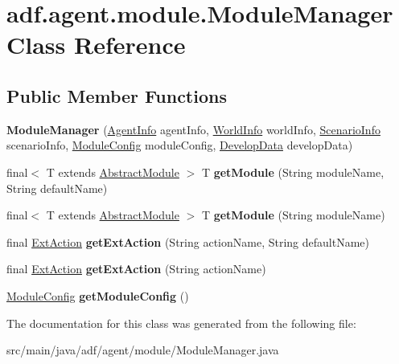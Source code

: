 \hypertarget{classadf_1_1agent_1_1module_1_1ModuleManager}{}\section{adf.\+agent.\+module.\+Module\+Manager Class Reference}
\label{classadf_1_1agent_1_1module_1_1ModuleManager}
\subsection*{Public Member Functions}
\begin{DoxyCompactItemize}
\item 
\hypertarget{classadf_1_1agent_1_1module_1_1ModuleManager_ac16f2c9e14069d9b77054a12e5b58b15}{}\label{classadf_1_1agent_1_1module_1_1ModuleManager_ac16f2c9e14069d9b77054a12e5b58b15} 
{\bfseries Module\+Manager} (\hyperlink{classadf_1_1agent_1_1info_1_1AgentInfo}{Agent\+Info} agent\+Info, \hyperlink{classadf_1_1agent_1_1info_1_1WorldInfo}{World\+Info} world\+Info, \hyperlink{classadf_1_1agent_1_1info_1_1ScenarioInfo}{Scenario\+Info} scenario\+Info, \hyperlink{classadf_1_1agent_1_1config_1_1ModuleConfig}{Module\+Config} module\+Config, \hyperlink{classadf_1_1agent_1_1develop_1_1DevelopData}{Develop\+Data} develop\+Data)
\item 
\hypertarget{classadf_1_1agent_1_1module_1_1ModuleManager_ae5bfff73dd4e1a9a70add9a92df5135b}{}\label{classadf_1_1agent_1_1module_1_1ModuleManager_ae5bfff73dd4e1a9a70add9a92df5135b} 
final$<$ T extends \hyperlink{classadf_1_1component_1_1module_1_1AbstractModule}{Abstract\+Module} $>$ T {\bfseries get\+Module} (String module\+Name, String default\+Name)
\item 
\hypertarget{classadf_1_1agent_1_1module_1_1ModuleManager_a97f961775277112b300c281b55b2571f}{}\label{classadf_1_1agent_1_1module_1_1ModuleManager_a97f961775277112b300c281b55b2571f} 
final$<$ T extends \hyperlink{classadf_1_1component_1_1module_1_1AbstractModule}{Abstract\+Module} $>$ T {\bfseries get\+Module} (String module\+Name)
\item 
\hypertarget{classadf_1_1agent_1_1module_1_1ModuleManager_a3f0a47b5d48381227842734b20fc2aee}{}\label{classadf_1_1agent_1_1module_1_1ModuleManager_a3f0a47b5d48381227842734b20fc2aee} 
final \hyperlink{classadf_1_1component_1_1extaction_1_1ExtAction}{Ext\+Action} {\bfseries get\+Ext\+Action} (String action\+Name, String default\+Name)
\item 
\hypertarget{classadf_1_1agent_1_1module_1_1ModuleManager_a6c4b4d88631190f3d7f2254918d934fa}{}\label{classadf_1_1agent_1_1module_1_1ModuleManager_a6c4b4d88631190f3d7f2254918d934fa} 
final \hyperlink{classadf_1_1component_1_1extaction_1_1ExtAction}{Ext\+Action} {\bfseries get\+Ext\+Action} (String action\+Name)
\item 
\hypertarget{classadf_1_1agent_1_1module_1_1ModuleManager_aea388134b8a03bf6237eb5874da9e095}{}\label{classadf_1_1agent_1_1module_1_1ModuleManager_aea388134b8a03bf6237eb5874da9e095} 
\hyperlink{classadf_1_1agent_1_1config_1_1ModuleConfig}{Module\+Config} {\bfseries get\+Module\+Config} ()
\end{DoxyCompactItemize}


The documentation for this class was generated from the following file\+:\begin{DoxyCompactItemize}
\item 
src/main/java/adf/agent/module/Module\+Manager.\+java\end{DoxyCompactItemize}
